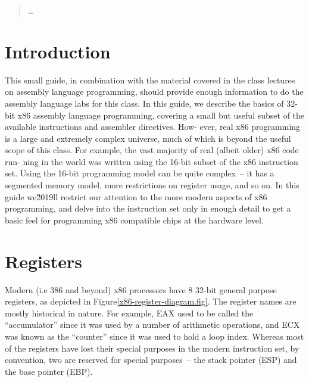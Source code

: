 \newcommand{\asminstructionsummary}[7]{
\noindent\begin{tabular}{p{1in}p{#6}p{#7}}
\multicolumn{3}{p{6.7in}}{\bf Instruction: #1} \\
\em Syntax: & \multicolumn{2}{p{5.7in}}{\tt #2} \\
\em Semantics: & \multicolumn{2}{p{5.7in}}{#3} \\
\em Examples: & \tt #4 & \tt #5 \\
\end{tabular}
}


\begin{quotation}
\ldots
\end{quotation}


\section{Introduction}

This small guide, in combination with the material covered in the
class lectures on assembly language programming, should provide enough
information to do the assembly language labs for this class. In this
guide, we describe the basics of 32-bit x86 assembly language
programming, covering a small but useful subset of the available
instructions and assembler directives. How- ever, real x86 programming
is a large and extremely complex universe, much of which is beyond the
useful scope of this class. For example, the vast majority of real
(albeit older) x86 code run- ning in the world was written using the
16-bit subset of the x86 instruction set. Using the 16-bit programming
model can be quite complex~-- it has a segmented memory model, more
restrictions on register usage, and so on. In this guide we\u2019ll
restrict our attention to the more modern aspects of x86 programming,
and delve into the instruction set only in enough detail to get a
basic feel for programming x86 compatible chips at the hardware level.

\section{Registers}

Modern (i.e 386 and beyond) x86 processors have 8 32-bit general
purpose registers, as depicted in
Figure\ref{x86-register-diagram.fig}. The register names are mostly
historical in nature. For example, EAX used to be called the
``accumulator'' since it was used by a number of arithmetic
operations, and ECX was known as the ``counter'' since it was used to
hold a loop index. Whereas most of the registers have lost their
special purposes in the modern instruction set, by convention, two are
reserved for special purposes~-- the stack pointer (ESP) and the base
pointer (EBP).

